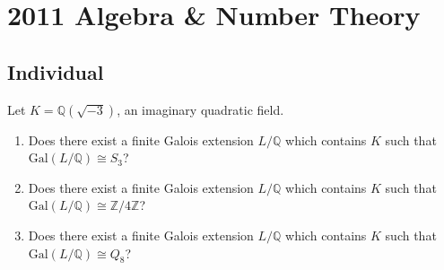 \section{2011 Algebra \& Number Theory}

\subsection*{Individual}

\begin{exercise}
\label{algebra:2011:1}
Let $K = \mathbb{Q}(\sqrt{-3})$, an imaginary quadratic field.

\begin{enumerate}
\item Does there exist a finite Galois extension $L/\mathbb{Q}$ which contains $K$ such that $\mathrm{Gal}(L/\mathbb{Q}) \cong S_3$?

\item Does there exist a finite Galois extension $L/\mathbb{Q}$ which contains $K$ such that $\mathrm{Gal}(L/\mathbb{Q}) \cong \mathbb{Z}/4\mathbb{Z}$?

\item Does there exist a finite Galois extension $L/\mathbb{Q}$ which contains $K$ such that $\mathrm{Gal}(L/\mathbb{Q}) \cong Q_8$?
\end{enumerate}
\end{exercise}


